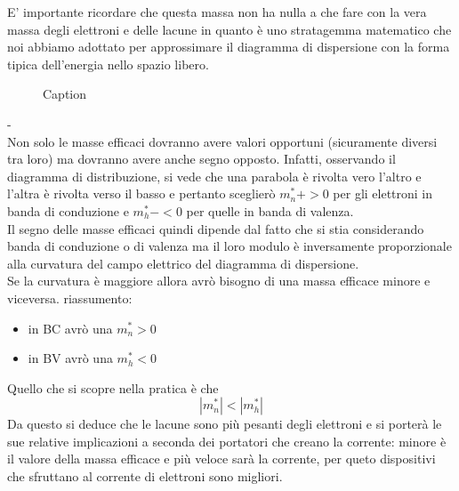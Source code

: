 E' importante ricordare che questa massa non ha nulla a che fare con la vera massa degli elettroni e delle lacune in quanto è uno stratagemma matematico che noi abbiamo adottato per approssimare il diagramma di dispersione con la forma tipica dell'energia nello spazio libero.
\begin{figure}
    \centering
    \caption{Caption}%
    \label{fig:enter_label}
\end{figure}
-\\
Non solo le masse efficaci dovranno avere valori opportuni (sicuramente diversi tra loro) ma dovranno avere anche segno opposto. Infatti, osservando il diagramma di distribuzione, si  vede che una parabola è rivolta vero l'altro e l'altra è rivolta verso il basso e pertanto sceglierò $m_n^*+ >0$ per gli elettroni in banda di conduzione e $m_h^*-<0$ per quelle in banda di valenza.\\
Il segno delle masse efficaci quindi dipende dal fatto che si stia considerando banda di conduzione o di valenza ma il loro modulo è inversamente proporzionale alla curvatura del campo elettrico del diagramma di dispersione.\\
Se la curvatura è maggiore allora avrò bisogno di una massa efficace minore e viceversa.
riassumento:
\begin{itemize}
    \item in BC avrò una $m_n^* >0$
    \item in BV avrò una $m_h^* <0$
\end{itemize}
Quello che si scopre nella pratica è che 
\begin{equation}
    \left | m_n^* \right | < \left | m_h^* \right | 
\end{equation}
Da questo si deduce che le lacune sono più pesanti degli elettroni e si porterà le sue relative implicazioni a seconda dei portatori che creano la corrente:
minore è il valore della massa efficace e più veloce sarà la corrente, per queto dispositivi che sfruttano al corrente di elettroni sono migliori.

